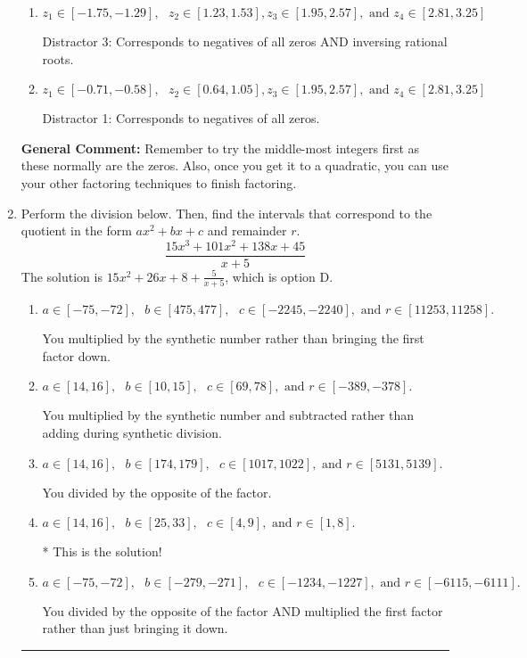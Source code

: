 \documentclass{extbook}[14pt]
\newcommand{\litem}[1]{\item #1

\rule{\textwidth}{0.4pt}}
\begin{document}
\begin{enumerate}
{\begin{enumerate}[label=\Alph*.]
* This is the solution!
\item \( z_1 \in [-1.75, -1.29], \text{   }  z_2 \in [1.23, 1.53], z_3 \in [1.95, 2.57], \text{   and   } z_4 \in [2.81, 3.25] \)

 Distractor 3: Corresponds to negatives of all zeros AND inversing rational roots.
\item \( z_1 \in [-0.71, -0.58], \text{   }  z_2 \in [0.64, 1.05], z_3 \in [1.95, 2.57], \text{   and   } z_4 \in [2.81, 3.25] \)

 Distractor 1: Corresponds to negatives of all zeros.
\end{enumerate}

\textbf{General Comment:} Remember to try the middle-most integers first as these normally are the zeros. Also, once you get it to a quadratic, you can use your other factoring techniques to finish factoring.
}
\litem{
Perform the division below. Then, find the intervals that correspond to the quotient in the form $ax^2+bx+c$ and remainder $r$.
\[ \frac{15x^{3} +101 x^{2} +138 x + 45}{x + 5} \]The solution is \( 15x^{2} +26 x + 8 + \frac{5}{x + 5} \), which is option D.\begin{enumerate}[label=\Alph*.]
\item \( a \in [-75, -72], \text{   } b \in [475, 477], \text{   } c \in [-2245, -2240], \text{   and   } r \in [11253, 11258]. \)

 You multiplied by the synthetic number rather than bringing the first factor down.
\item \( a \in [14, 16], \text{   } b \in [10, 15], \text{   } c \in [69, 78], \text{   and   } r \in [-389, -378]. \)

 You multiplied by the synthetic number and subtracted rather than adding during synthetic division.
\item \( a \in [14, 16], \text{   } b \in [174, 179], \text{   } c \in [1017, 1022], \text{   and   } r \in [5131, 5139]. \)

 You divided by the opposite of the factor.
\item \( a \in [14, 16], \text{   } b \in [25, 33], \text{   } c \in [4, 9], \text{   and   } r \in [1, 8]. \)

* This is the solution!
\item \( a \in [-75, -72], \text{   } b \in [-279, -271], \text{   } c \in [-1234, -1227], \text{   and   } r \in [-6115, -6111]. \)

 You divided by the opposite of the factor AND multiplied the first factor rather than just bringing it down.
\end{enumerate}

}
\end{enumerate}
\end{document}
